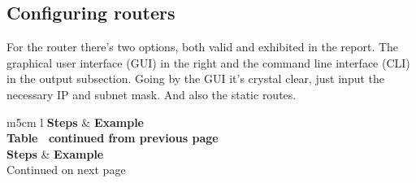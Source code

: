 \documentclass[11pt,a4paper]{report}
\begin{document}
    \subsection{Configuring routers}
        For the router there's two options, both valid and exhibited in the report. The graphical user interface (GUI) in the right and the command line interface (CLI) in the output subsection. Going by the GUI it's crystal clear, just input the necessary IP and subnet mask. And also the static routes. \\

        \begin{flushleft}
                \begin{center}
                    \begin{longtable}{ m{5cm} l }
                        \textbf{Steps} & \textbf{Example} \\
                        \hline
                        \endfirsthead
                        {{\bfseries Table \thetable\ continued from previous page}} \\
                        \textbf{Steps} & \textbf{Example} \\
                        \hline
                        \endhead
                        \hline Continued on next page \\
                        \endfoot
                        \endlastfoot


\end{longtable}
\end{center}
\end{flushleft}
\end{document}
